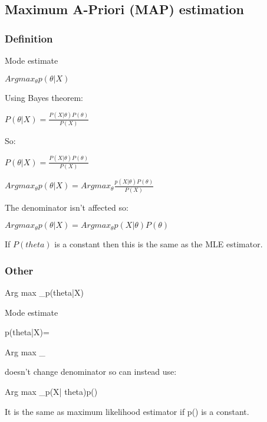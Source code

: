 
\subsection{Maximum A-Priori (MAP) estimation}

\subsubsection{Definition}

Mode estimate

\(Arg max_\theta p(\theta | X)\)

Using Bayes theorem:

\(P(\theta | X)= \frac{P(X|\theta )P(\theta)}{P(X)}\)

So:

\(P(\theta | X)= \frac{P(X|\theta )P(\theta)}{P(X)}\)

\(Argmax_\theta p(\theta | X)=Argmax_\theta \frac{p(X|\theta )P(\theta)}{P(X)}\)

The denominator isn't affected so:

\(Arg max_\theta p(\theta | X)=Arg max_\theta p(X|\theta )P(\theta)\)

If \(P(theta )\) is a constant then this is the same as the MLE estimator.

\subsubsection{Other}

Arg max _\theta p(theta|X)

Mode estimate

p(theta|X)= 

Arg max _\theta {}

\theta doesn't change denominator so can instead use:

Arg max _\theta p(X| theta)p(\theta )

It is the same as maximum likelihood estimator if p(\theta ) is a constant. 

